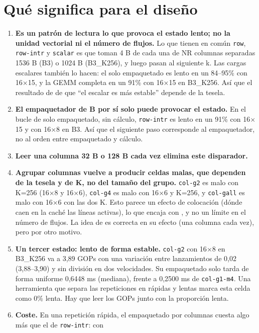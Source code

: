 \section{Qué significa para el diseño}
\label{sec:insight}
\begin{enumerate}
  \item \textbf{Es un patrón de lectura lo que provoca el estado lento; no la unidad vectorial ni el número de flujos.} Lo que tienen
  en común \texttt{row}, \texttt{row-intr} y \texttt{scalar} es que toman 4 B de cada una de NR columnas separadas 1536 B (B3) o
  1024 B (B3\_K256), y luego pasan al siguiente k. Las cargas escalares también lo hacen: el solo empaquetado es lento en un 84--95\%
  con 16$\times$15, y la GEMM completa en un 91\% con 16$\times$15 en B3\_K256. Así que el resultado de  de que ``el escalar
  es más estable'' depende de la tesela.
  \item \textbf{El empaquetador de B por sí solo puede provocar el estado.} En el bucle de solo empaquetado, sin cálculo,
  \texttt{row-intr} es lento en un 91\% con 16$\times$15 y con 16$\times$8 en B3. Así que el siguiente paso corresponde al
  empaquetador, no al orden entre empaquetado y cálculo.
  \item \textbf{Leer una columna 32 B o 128 B cada vez elimina este disparador.} 
  \item \textbf{Agrupar columnas vuelve a producir celdas malas, que dependen de la tesela y de K, no del tamaño del grupo.}
  \texttt{col-g2} es malo con K=256 (16$\times$8 y 16$\times$6), \texttt{col-g4} es malo con 16$\times$6 y K=256, y \texttt{col-gall}
  es malo con 16$\times$6 con las dos K. Esto parece un efecto de colocación (dónde caen en la caché las líneas activas), lo que
  encaja con , y no un límite en el número de flujos. La idea de  es correcta en su efecto (una columna cada vez), pero
  por otro motivo.
  \item \textbf{Un tercer estado: lento de forma estable.} \texttt{col-g2} con 16$\times$8 en B3\_K256 va a 3,89 GOPs con una
  variación entre lanzamientos de 0,02 (3,88--3,90) y sin división en dos velocidades. Su empaquetado solo tarda de forma uniforme
  0,6448 ms (mediana), frente a 0,2500 ms de \texttt{col-g1-m4}. Una herramienta que separa las repeticiones en rápidas y lentas marca
  esta celda como 0\% lenta. Hay que leer los GOPs junto con la proporción lenta.
  \item \textbf{Coste.} En una repetición rápida, el empaquetado por columnas cuesta algo más que el de \texttt{row-intr}: con

\end{enumerate}
